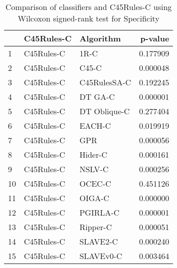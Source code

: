 \begin{table}
\footnotesize
\caption{Comparison of classifiers and C45Rules-C using Wilcoxon signed-rank test for Specificity}
\label{tab:C45Rules-C wilcoxon Specificity comparison}
\begin{tabular}{lllr}
\hline
 & C45Rules-C & Algorithm & p-value \\
\hline
1 & C45Rules-C & 1R-C & 0.177909 \\
2 & C45Rules-C & C45-C & 0.000048 \\
3 & C45Rules-C & C45RulesSA-C & 0.192245 \\
4 & C45Rules-C & DT GA-C & 0.000001 \\
5 & C45Rules-C & DT Oblique-C & 0.277404 \\
6 & C45Rules-C & EACH-C & 0.019919 \\
7 & C45Rules-C & GPR & 0.000056 \\
8 & C45Rules-C & Hider-C & 0.000161 \\
9 & C45Rules-C & NSLV-C & 0.000256 \\
10 & C45Rules-C & OCEC-C & 0.451126 \\
11 & C45Rules-C & OIGA-C & 0.000000 \\
12 & C45Rules-C & PGIRLA-C & 0.000001 \\
13 & C45Rules-C & Ripper-C & 0.000051 \\
14 & C45Rules-C & SLAVE2-C & 0.000240 \\
15 & C45Rules-C & SLAVEv0-C & 0.003464 \\
\hline
\end{tabular}
\end{table}

